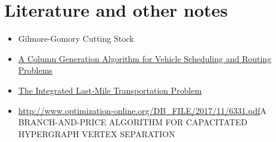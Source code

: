 \section{Literature and other notes}

\begin{itemize}
\item Gilmore-Gomory Cutting Stock~\cite{Gilmore-Gomory}
\item \href{http://www.optimization-online.org/DB_HTML/2018/06/6648.html}{A Column Generation Algorithm for Vehicle Scheduling and Routing Problems}
\item \href{http://www.optimization-online.org/DB_HTML/2018/06/6670.html}{The Integrated Last-Mile Transportation Problem}
\item \url{http://www.optimization-online.org/DB_FILE/2017/11/6331.pdf}{A BRANCH-AND-PRICE ALGORITHM FOR CAPACITATED
HYPERGRAPH VERTEX SEPARATION}
\end{itemize}

\begin{resource}
\end{resource}
